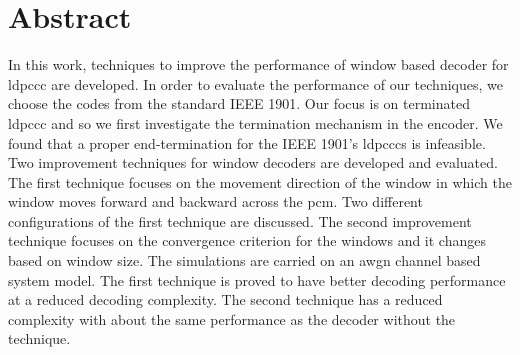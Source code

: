 \chapter*{Abstract}
In this work, techniques to improve the performance of window based decoder for \gls{ldpccc} are developed. In order to evaluate the performance of our techniques, we choose the codes from the standard IEEE 1901. Our focus is on terminated \gls{ldpccc} and so we first investigate the termination mechanism in the encoder. We found that a proper end-termination for the IEEE 1901's \glspl{ldpccc} is infeasible. Two improvement techniques for window decoders are developed and evaluated. The first technique focuses on the movement direction of the window in which the window moves forward and backward across the \gls{pcm}. Two different configurations of the first technique are discussed. The second improvement technique focuses on the convergence criterion for the windows and it changes based on window size. The simulations are carried on an \gls{awgn} channel based system model. The first technique is proved to have better decoding performance at a reduced decoding complexity. The second technique has a reduced complexity with about the same performance as the decoder without the technique.